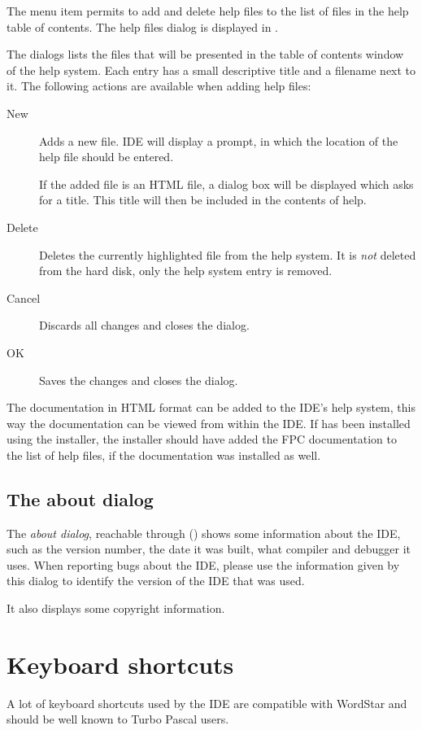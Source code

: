 The menu item  permits to add and delete help files to the
list of files in the help table of contents.
The help files dialog is displayed in .


The dialogs lists the files that will be presented in the table of contents
window of the help system. Each entry has a small descriptive title and a
filename next to it. The following actions are available when adding help
files:
\begin{description}
\item[New] Adds a new file. IDE will display a prompt, in which the
location of the help file should be entered.

If the added file is an HTML file, a dialog box will be displayed
which asks for a title. This title will then be included in the
contents of help.
\item[Delete] Deletes the currently highlighted file from the help system.
It is \emph{not} deleted from the hard disk, only the help system entry is
removed.
\item[Cancel] Discards all changes and closes the dialog.
\item[OK] Saves the changes and closes the dialog.
\end{description}

The \fpc documentation in HTML format can be added to the IDE's help system,
this way the documentation can be viewed from within the IDE. If \fpc has
been installed using the installer, the installer should have added the
FPC documentation to the list of help files, if the documentation was
installed as well.

%
%
\subsection{The about dialog}
\label{se:about}
The {\em about dialog}, reachable through () shows some
information about the IDE, such as the version number, the date it was built,
what compiler and debugger it uses. When reporting bugs about the IDE, please
use the information given by this dialog to identify the version of the IDE
that was used.

It also displays some copyright information.

\section{Keyboard shortcuts}
\label{se:keyshortcuts}
A lot of keyboard shortcuts used by the IDE are compatible with
WordStar and should be well known to Turbo Pascal users.

